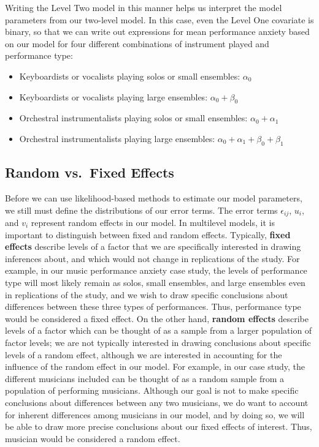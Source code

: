 \documentclass[
]{krantz}
\providecommand{\tightlist}{%
  \setlength{\itemsep}{0pt}\setlength{\parskip}{0pt}}
\begin{document}
Writing the Level Two model in this manner helps us interpret the model parameters from our two-level model. In this case, even the Level One covariate is binary, so that we can write out expressions for mean performance anxiety based on our model for four different combinations of instrument played and performance type:

\begin{itemize}
\tightlist
\item
  Keyboardists or vocalists playing solos or small ensembles: \(\alpha_{0}\)
\item
  Keyboardists or vocalists playing large ensembles: \(\alpha_{0}+\beta_{0}\)
\item
  Orchestral instrumentalists playing solos or small ensembles: \(\alpha_{0}+\alpha_{1}\)
\item
  Orchestral instrumentalists playing large ensembles: \(\alpha_{0}+\alpha_{1}+\beta_{0}+\beta_{1}\)
\end{itemize}

\hypertarget{random-vs.-fixed-effects}{%
\subsection{Random vs.~Fixed Effects}\label{random-vs.-fixed-effects}}

Before we can use likelihood-based methods to estimate our model parameters, we still must define the distributions of our error terms. The error terms \(\epsilon_{ij}\), \(u_{i}\), and \(v_{i}\) represent random effects in our model. In multilevel models, it is important to distinguish between fixed and random effects. Typically, \textbf{fixed effects}  describe levels of a factor that we are specifically interested in drawing inferences about, and which would not change in replications of the study. For example, in our music performance anxiety case study, the levels of performance type will most likely remain as solos, small ensembles, and large ensembles even in replications of the study, and we wish to draw specific conclusions about differences between these three types of performances. Thus, performance type would be considered a fixed effect. On the other hand, \textbf{random effects}  describe levels of a factor which can be thought of as a sample from a larger population of factor levels; we are not typically interested in drawing conclusions about specific levels of a random effect, although we are interested in accounting for the influence of the random effect in our model. For example, in our case study, the different musicians included can be thought of as a random sample from a population of performing musicians. Although our goal is not to make specific conclusions about differences between any two musicians, we do want to account for inherent differences among musicians in our model, and by doing so, we will be able to draw more precise conclusions about our fixed effects of interest. Thus, musician would be considered a random effect.
\end{document}
